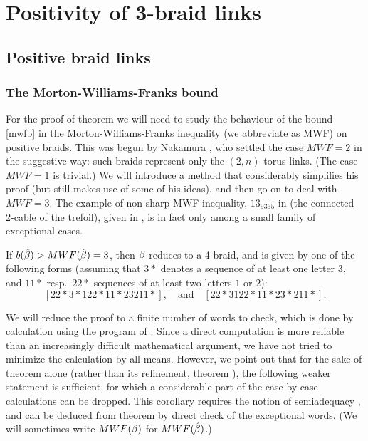 \section{Positivity of 3-braid links}

\subsection{Positive braid links\label{S2.2}}

\subsubsection{The Morton-Williams-Franks bound}

For the proof of theorem  we will need to study
the behaviour of the bound \eqref{mwfb} in the Morton-Williams-Franks
inequality (we abbreviate as MWF) on positive
braids. This was begun by Nakamura \cite{Nakamura},
who settled the case $MWF=2$ in the suggestive way: such braids
represent only the $(2,n)$-torus links. (The case $MWF=1$ is
trivial.) We will introduce a method that considerably simplifies
his proof (but still makes use of some of his ideas), and
then go on to deal with $MWF=3$. The example of non-sharp
MWF inequality, $13_{9365}$ in \cite{KnotScape} (the connected
2-cable of the trefoil), given in \cite{MorSho}, is in fact
only among a small family of exceptional cases.

\begin{theorem}\label{thmwf}
If $b(\hat{\beta})>MWF(\hat{\beta})=3$, then $\beta$ reduces to a 4-braid,
and is given by one of the following forms (assuming that $3*$
denotes a sequence of at least one letter $3$, and $11*$
resp.\ $22*$ sequences of at least two letters $1$ or $2$):\\
\[
[22*3*122*11*23211*], \quad\mbox{and}\quad [22*3122*11*23*211*].
\]
\end{theorem}


We will reduce the proof to a finite number of words to
check, which is done by calculation using the program of
\cite{MorSho}. Since a direct computation is more reliable
than an increasingly difficult mathematical argument, we have
not tried to minimize the calculation by all means. However,
we point out that for the sake of theorem 
alone (rather than its refinement, theorem ),
the following weaker statement is sufficient, for which
a considerable part of the case-by-case calculations can
be dropped. This corollary requires the notion of
semiadequacy \cite{LickThis}, and can be deduced from theorem
 by direct check of the exceptional words.
(We will sometimes write $MWF(\beta)$ for $MWF(\hat{\beta})$.)

